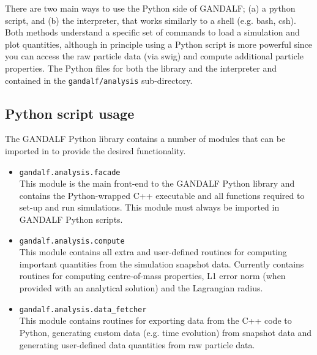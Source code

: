\documentclass[a4paper]{article}
\newcommand{\var}[1]{\texttt{#1}}
\begin{document}

There are two main ways to use the Python side of GANDALF; (a) a python script, and  (b) the interpreter, that works similarly to a shell (e.g. bash, csh).  Both methods understand a specific set of commands to load a simulation and plot quantities, although in principle using a Python script is more powerful %
since you can access the raw particle data (via swig) and compute additional particle properties.  The Python files for both the library and the interpreter and contained in the \var{gandalf/analysis} sub-directory.



\subsection{Python script usage}
The GANDALF Python library contains a number of modules that can be imported in to provide the desired functionality.  
\begin{itemize}
\item \var{gandalf.analysis.facade} \\
\noindent This module is the main front-end to the GANDALF Python library and contains the Python-wrapped C++ executable and all functions required to set-up and run simulations.  This module must always be imported in GANDALF Python scripts.
\item \var{gandalf.analysis.compute} \\
\noindent This module contains all extra and user-defined routines for computing important quantities from the simulation snapshot data.  Currently contains routines for computing centre-of-mass properties, L1 error norm (when provided with an analytical solution) and the Lagrangian radius.
\item \var{gandalf.analysis.data\_fetcher} \\
This module contains routines for exporting data from the C++ code to Python, generating custom data (e.g. time evolution) from snapshot data and generating user-defined data quantities from raw particle data.
\end{itemize}
\end{document}
